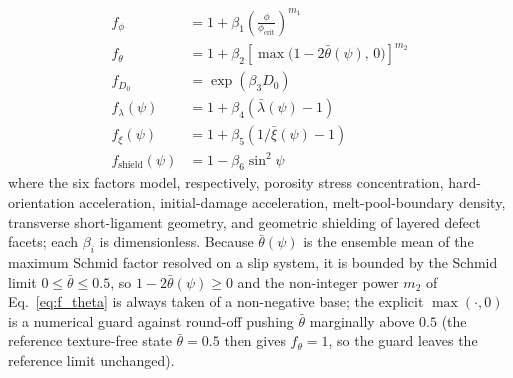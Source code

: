 \documentclass[12pt,a4paper,twocolumn]{article}
\begin{document}
\begin{align}
f_\phi &= 1 + \beta_1 \left(\frac{\phi}{\phi_{\text{crit}}}\right)^{m_1} \label{eq:f_phi} \\
f_\theta &= 1 + \beta_2 \left[\max\!\big(1 - 2\bar{\theta}(\psi),\,0\big)\right]^{m_2} \label{eq:f_theta} \\
f_{D_0} &= \exp(\beta_3 D_0) \label{eq:f_D0} \\
f_\lambda(\psi) &= 1 + \beta_4 \left(\bar{\lambda}(\psi) - 1\right) \label{eq:f_lambda} \\
f_\xi(\psi) &= 1 + \beta_5 \left(1/\bar{\xi}(\psi) - 1\right) \label{eq:f_xi} \\
f_{\text{shield}}(\psi) &= 1 - \beta_6 \sin^2\psi \label{eq:f_shield}
\end{align}
where the six factors model, respectively, porosity stress concentration, hard-orientation acceleration, initial-damage acceleration, melt-pool-boundary density, transverse short-ligament geometry, and geometric shielding of layered defect facets; each $\beta_i$ is dimensionless. Because $\bar{\theta}(\psi)$ is the ensemble mean of the maximum Schmid factor resolved on a slip system, it is bounded by the Schmid limit $0 \le \bar{\theta} \le 0.5$, so $1 - 2\bar{\theta}(\psi) \ge 0$ and the non-integer power $m_2$ of Eq.~\eqref{eq:f_theta} is always taken of a non-negative base; the explicit $\max(\cdot,0)$ is a numerical guard against round-off pushing $\bar{\theta}$ marginally above $0.5$ (the reference texture-free state $\bar{\theta} = 0.5$ then gives $f_\theta = 1$, so the guard leaves the reference limit unchanged).
\end{document}
